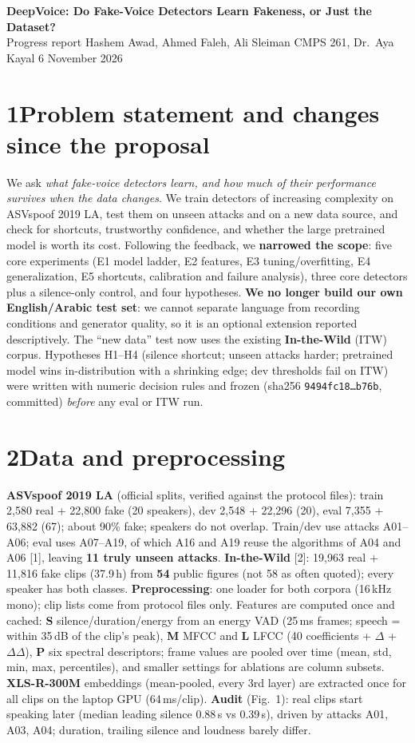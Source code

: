 \documentclass[10pt]{article}
\begin{document}
{\large\bfseries DeepVoice: Do Fake-Voice Detectors Learn Fakeness, or Just the Dataset?}\\[2pt]
Progress report \textbullet{} Hashem Awad, Ahmed Faleh, Ali Sleiman \textbullet{} CMPS 261, Dr.\ Aya Kayal \textbullet{} 6 November 2026

\section*{1\quad Problem statement and changes since the proposal}
We ask \emph{what fake-voice detectors learn, and how much of their performance survives when the data
changes}. We train detectors of increasing complexity on ASVspoof 2019 LA, test them on unseen attacks
and on a new data source, and check for shortcuts, trustworthy confidence, and whether the large
pretrained model is worth its cost. Following the feedback, we \textbf{narrowed the scope}: five core
experiments (E1 model ladder, E2 features, E3 tuning/overfitting, E4 generalization, E5 shortcuts,
calibration and failure analysis), three core detectors plus a silence-only control, and four
hypotheses. \textbf{We no longer build our own English/Arabic test set}: we cannot separate language
from recording conditions and generator quality, so it is an optional extension reported
descriptively. The ``new data'' test now uses the existing \textbf{In-the-Wild} (ITW) corpus.
Hypotheses H1--H4 (silence shortcut; unseen attacks harder; pretrained model wins in-distribution with
a shrinking edge; dev thresholds fail on ITW) were written with numeric decision rules and frozen
(sha256 \texttt{9494fc18\ldots b76b}, committed) \emph{before} any eval or ITW run.

\section*{2\quad Data and preprocessing}
\textbf{ASVspoof 2019 LA} (official splits, verified against the protocol files): train 2,580 real +
22,800 fake (20 speakers), dev 2,548 + 22,296 (20), eval 7,355 + 63,882 (67); about 90\% fake;
speakers do not overlap. Train/dev use attacks A01--A06; eval uses A07--A19, of which A16 and A19 reuse
the algorithms of A04 and A06 [1], leaving \textbf{11 truly unseen attacks}.
\textbf{In-the-Wild} [2]: 19,963 real + 11,816 fake clips (37.9\,h) from \textbf{54} public figures
(not 58 as often quoted); every speaker has both classes. \textbf{Preprocessing}: one loader for both
corpora (16\,kHz mono); clip lists come from protocol files only. Features are computed once and
cached: \textbf{S} silence/duration/energy from an energy VAD (25\,ms frames; speech = within 35\,dB of
the clip's peak), \textbf{M} MFCC and \textbf{L} LFCC (40 coefficients + $\Delta$ + $\Delta\Delta$),
\textbf{P} six spectral descriptors; frame values are pooled over time (mean, std, min, max,
percentiles), and smaller settings for ablations are column subsets. \textbf{XLS-R-300M} embeddings
(mean-pooled, every 3rd layer) are extracted once for all clips on the laptop GPU (64\,ms/clip).
\textbf{Audit} (Fig.~1): real clips start speaking later (median leading silence 0.88\,s vs 0.39\,s),
driven by attacks A01, A03, A04; duration, trailing silence and loudness barely differ.
\end{document}
